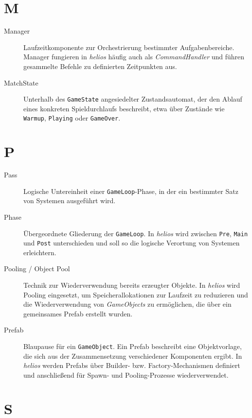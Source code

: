 \section*{M}

\begin{description}
    \item[Manager] Laufzeitkomponente zur Orchestrierung bestimmter Aufgabenbereiche.
    Manager fungieren in \textit{helios} häufig auch als \textit{CommandHandler} und führen gesammelte Befehle zu definierten Zeitpunkten aus.

    \item[MatchState] Unterhalb des \texttt{GameState} angesiedelter Zustandsautomat, der den Ablauf eines konkreten Spieldurchlaufs beschreibt, etwa über Zustände wie \texttt{Warmup}, \texttt{Playing} oder \texttt{GameOver}.
\end{description}

\section*{P}

\begin{description}
    \item[Pass] Logische Untereinheit einer \texttt{GameLoop}-Phase, in der ein bestimmter Satz von Systemen ausgeführt wird.

    \item[Phase] Übergeordnete Gliederung der \texttt{GameLoop}.
    In \textit{helios} wird zwischen \texttt{Pre}, \texttt{Main} und \texttt{Post} unterschieden und soll so die logische Verortung von Systemen erleichtern.

    \item[Pooling / Object Pool] Technik zur Wiederverwendung bereits erzeugter Objekte.
    In \textit{helios} wird Pooling eingesetzt, um Speicherallokationen zur Laufzeit zu reduzieren und die Wiederverwendung von \textit{GameObjects} zu ermöglichen, die über ein gemeinsames Prefab erstellt wurden.

    \item[Prefab] Blaupause für ein \texttt{GameObject}.
    Ein Prefab beschreibt eine Objektvorlage, die sich aus der Zusammensetzung verschiedener Komponenten ergibt.
    In \textit{helios} werden Prefabs über Builder- bzw. Factory-Mechanismen definiert und anschließend für Spawn- und Pooling-Prozesse wiederverwendet.
\end{description}

\section*{S}

